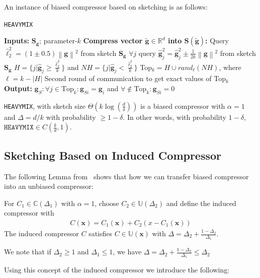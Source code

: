 An instance of biased compressor based on sketching is as follows:
\begin{algorithm}[H]
\caption{\texttt{HEAVYMIX}~\cite{ivkin2019communication} }\label{Alg:sketch}
\begin{algorithmic}[1]
\State \textbf{Inputs:} $\mathbf{S}_{\mathbf{g}}$; parameter-$k$
\State \textbf{Compress vector $\tilde{\mathbf{g}}\in\mathbb{R}^{d}$ into $\mathbf{S}\left(\tilde{\mathbf{g}}\right)$:}
\State Query $\hat{\ell}_2^2=\left(1\pm 0.5\right)\left\|\mathbf{g}\right\|^2$ from sketch $\mathbf{S}_{\mathbf{g}}$
\State $\forall j$ query $\hat{\mathbf{g}}_j^2=\hat{\mathbf{g}}_j^2\pm \frac{1}{2k}\left\|\mathbf{g}\right\|^2$ from sketch $\mathbf{S}_{\mathbf{g}}$
\State $H=\{j|\hat{\mathbf{g}}_j\geq \frac{\hat{\ell}_2^2}{k}\}$ and $NH=\{j|\hat{\mathbf{g}}_j<\frac{\hat{\ell}_2^2}{k}\}$
\State Top$_k=H\cup rand_\ell(NH)$, where $\ell=k-\left|H\right|$
\State Second round of communication to get exact values of Top$_k$ 
\State \textbf{Output:} $\mathbf{g}_S:\forall j\in\text{Top}_k:\mathbf{g}_{Si}=\mathbf{g}_{i}$ and $\forall\notin\text{Top}_k: \mathbf{g}_{Si}=0$
\end{algorithmic}
\end{algorithm}

\begin{lemma}
\texttt{HEAVYMIX}, with sketch size $\Theta\left(k\log\left(\frac{d}{\delta}\right)\right)$ is a biased compressor with $\alpha=1$ and  $\Delta=d/k$ with probability $\geq1-\delta$. In other words, with probability $1-\delta$, $\texttt{HEAVYMIX}\in C(\frac{k}{d},1)$. 
\end{lemma}
\subsection{Sketching Based on Induced Compressor}
The following Lemma from~\cite{horvath2020better} shows that how we can transfer biased compressor into an unbiased compressor: 
\begin{lemma}\label{lemm:induced_compress}
For $C_1\in \mathbb{C}(\Delta_1)$ with $\alpha=1$, choose $C_2\in \mathbb{U}(\Delta_2)$ and define the induced compressor with
\begin{align}
    C(\mathbf{x})=C_1(\mathbf{x})+C_2\left(x-C_1\left(\mathbf{x}\right)\right)
\end{align}
The induced compressor $C$ satisfies $C\in\mathbb{U}(\mathbf{x})$ with $\Delta=\Delta_2+\frac{1-\Delta_2}{\Delta_1}$.
\end{lemma}
\begin{remark}
We note that if $\Delta_2\geq 1$ and $\Delta_1\leq 1$, we have $\Delta=\Delta_2+\frac{1-\Delta_2}{\Delta_1}\leq \Delta_2$
\end{remark}
Using this concept of the induced compressor we introduce the following:


